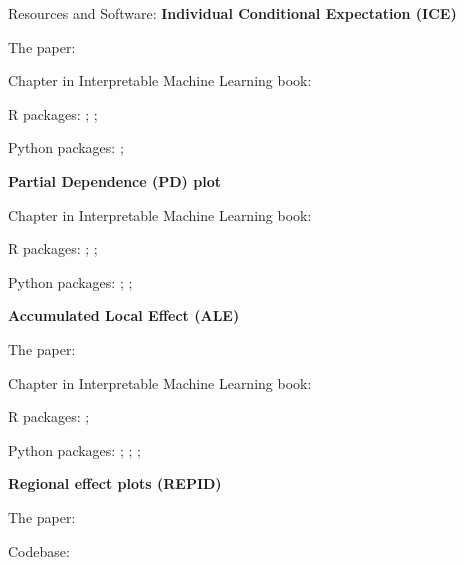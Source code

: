 \documentclass[10pt,compress,t,notes=noshow,xcolor=table]{beamer}
\begin{document}


\begin{framev}[align=top]{Resources and Software:}
\textbf{Individual Conditional Expectation (ICE)}
\begin{itemizeM}
\item The paper: 
\item Chapter in Interpretable Machine Learning book: 
\item R packages: ; ; 
\item Python packages: ; 
\end{itemizeM}
\spacer[0.25]
\textbf{Partial Dependence (PD) plot}
\begin{itemizeM}
\item Chapter in Interpretable Machine Learning book: 
\item R packages: ; ; 
\item Python packages: ; ; 
\end{itemizeM}
\textbf{Accumulated Local Effect (ALE)}
\begin{itemizeM}
\item The paper: 
\item Chapter in Interpretable Machine Learning book: 
\item R packages: ; 
\item Python packages: ; ; ; 
\end{itemizeM}
\textbf{Regional effect plots (REPID)}
\begin{itemizeM}
\item The paper: 
\item Codebase: 
\end{itemizeM}
\end{framev}


\endlecture
\end{document}
